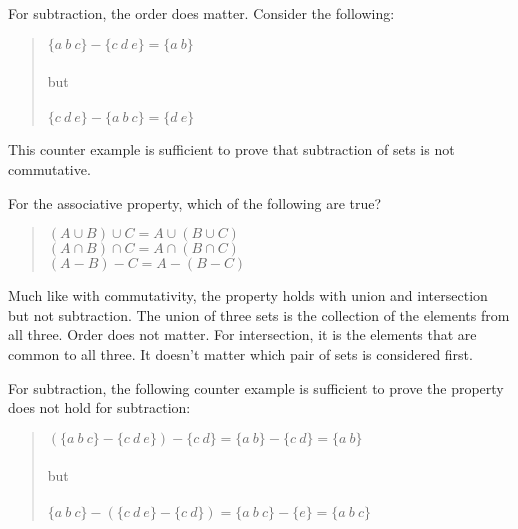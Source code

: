 \documentclass[letterpaper,12pt,openany,reqno]{book}%
\begin{document}
\begin{center}
\end{center}

For subtraction, the order does matter. Consider the following:
\begin{quote}
$\{a \ b \ c\} - \{c \ d \ e\} = \{a \ b\}$\\
\\
but\\
\\
$\{c \ d \ e\} - \{a \ b \ c\} = \{d \ e\}$\\
\end{quote}
This counter example is sufficient to prove that subtraction of sets is not commutative.

For the associative property, which of the following are true?
\begin{quote}
$(A \cup B) \cup C = A \cup (B \cup C)$\\
$(A \cap B) \cap C = A \cap (B \cap C)$\\
$(A - B) - C = A - (B - C)$
\end{quote}

Much like with commutativity, the property holds with union and intersection but not subtraction. The union of three sets is the collection of the elements from all three. Order does not matter. For intersection, it is the elements that are common to all three. It doesn't matter which pair of sets is considered first.

For subtraction, the following counter example is sufficient to prove the property does not hold for subtraction:
\begin{quote}
$(\{a \ b \ c\} - \{c \ d \ e\}) - \{c \ d\} = \{a \ b\} - \{c \ d\} = \{a \ b\}$\\
\\
but\\
\\
$\{a \ b \ c\} - (\{c \ d \ e\} - \{c \ d\}) = \{a \ b \ c\} - \{e\} = \{a \ b \ c\}$\\
\end{quote}
\end{document}
